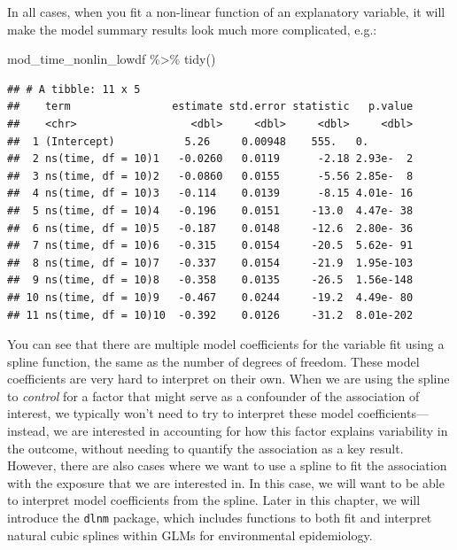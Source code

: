 \documentclass[
]{book}
\newenvironment{Shaded}{\begin{snugshade}}{\end{snugshade}}
\newcommand{\FunctionTok}[1]{\textcolor[rgb]{0.00,0.00,0.00}{#1}}
\newcommand{\NormalTok}[1]{#1}
\newcommand{\SpecialCharTok}[1]{\textcolor[rgb]{0.00,0.00,0.00}{#1}}
\begin{document}
In all cases, when you fit a non-linear function of an explanatory variable,
it will make the model summary results look much more complicated, e.g.:

\begin{Shaded}
\begin{Highlighting}[]
\NormalTok{mod\_time\_nonlin\_lowdf }\SpecialCharTok{\%\textgreater{}\%} 
  \FunctionTok{tidy}\NormalTok{()}
\end{Highlighting}
\end{Shaded}

\begin{verbatim}
## # A tibble: 11 x 5
##    term                estimate std.error statistic   p.value
##    <chr>                  <dbl>     <dbl>     <dbl>     <dbl>
##  1 (Intercept)           5.26     0.00948    555.   0.       
##  2 ns(time, df = 10)1   -0.0260   0.0119      -2.18 2.93e-  2
##  3 ns(time, df = 10)2   -0.0860   0.0155      -5.56 2.85e-  8
##  4 ns(time, df = 10)3   -0.114    0.0139      -8.15 4.01e- 16
##  5 ns(time, df = 10)4   -0.196    0.0151     -13.0  4.47e- 38
##  6 ns(time, df = 10)5   -0.187    0.0148     -12.6  2.80e- 36
##  7 ns(time, df = 10)6   -0.315    0.0154     -20.5  5.62e- 91
##  8 ns(time, df = 10)7   -0.337    0.0154     -21.9  1.95e-103
##  9 ns(time, df = 10)8   -0.358    0.0135     -26.5  1.56e-148
## 10 ns(time, df = 10)9   -0.467    0.0244     -19.2  4.49e- 80
## 11 ns(time, df = 10)10  -0.392    0.0126     -31.2  8.01e-202
\end{verbatim}

You can see that there are multiple model coefficients for the variable fit
using a spline function, the same as the number of degrees of freedom. These
model coefficients are very hard to interpret on their own. When we are using
the spline to \emph{control} for a factor that might serve as a confounder of the
association of interest, we typically won't need to try to interpret these
model coefficients---instead, we are interested in accounting for how this
factor explains variability in the outcome, without needing to quantify the
association as a key result. However, there are also cases where we want to
use a spline to fit the association with the exposure that we are interested
in. In this case, we will want to be able to interpret model coefficients from
the spline. Later in this chapter, we will introduce the \texttt{dlnm} package, which
includes functions to both fit and interpret natural cubic splines within
GLMs for environmental epidemiology.
\end{document}
